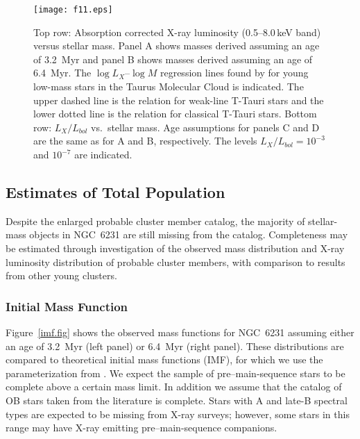 \documentclass[twocolumn,tighten]{aastex61}
\begin{document}
\begin{figure*}
\centering
\texttt{[image: f11.eps]} 
\caption{Top row: Absorption corrected X-ray luminosity (0.5--8.0\,keV band) versus stellar mass. Panel A shows masses derived assuming an age of 3.2~Myr and panel B shows masses derived assuming an age of 6.4~Myr. The $\log L_{X}$--$\log M$ regression lines found by \citet{2007A&A...468..425T} for young low-mass stars in the Taurus Molecular Cloud is indicated. The upper dashed line is the relation for weak-line T-Tauri stars and the lower dotted line is the relation for classical T-Tauri stars. Bottom row: $L_{X}/L_{bol}$ vs.\ stellar mass. Age assumptions for panels C and D are the same as for A and B, respectively. The levels $L_{X}/L_{bol}=10^{-3}$ and $10^{-7}$ are indicated.
 \label{lx_v_mass.fig}}
\end{figure*}



\subsection{Estimates of Total Population \label{imf.sec}}

Despite the enlarged probable cluster member catalog, the majority of stellar-mass objects in NGC~6231 are still missing from the catalog. Completeness may be estimated through investigation of the observed mass distribution and X-ray luminosity distribution of probable cluster members, with comparison to results from other young clusters.

\subsubsection{Initial Mass Function}

Figure~\ref{imf.fig} shows the observed mass functions for NGC~6231 assuming either an age of 3.2~Myr (left panel) or 6.4~Myr (right panel). These distributions are compared to theoretical initial mass functions (IMF), for which we use the  parameterization from \citet{2013MNRAS.429.1725M}. We expect the sample of pre--main-sequence stars to be complete above a certain mass limit. In addition we assume that the catalog of OB stars taken from the literature is complete. Stars with A and late-B spectral types are expected to be missing from X-ray surveys; however, some stars in this range may have X-ray emitting pre--main-sequence companions.
\end{document}

